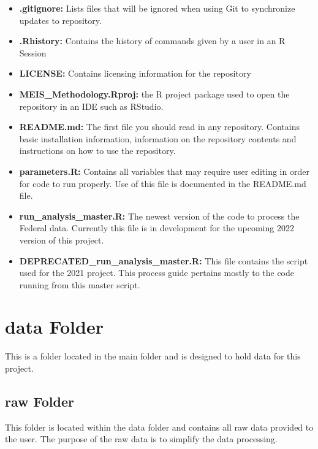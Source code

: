 \documentclass[
]{book}
\providecommand{\tightlist}{%
  \setlength{\itemsep}{0pt}\setlength{\parskip}{0pt}}
\begin{document}
\begin{itemize}
\tightlist
\item
  \textbf{.gitignore:} Lists files that will be ignored when using Git to synchronize updates to repository.
\item
  \textbf{.Rhistory:} Contains the history of commands given by a user in an R Session
\item
  \textbf{LICENSE:} Contains licensing information for the repository
\item
  \textbf{MEIS\_Methodology.Rproj:} the R project package used to open the repository in an IDE such as RStudio.
\item
  \textbf{README.md:} The first file you should read in any repository. Contains basic installation information, information on the repository contents and instructions on how to use the repository.
\item
  \textbf{parameters.R:} Contains all variables that may require user editing in order for code to run properly. Use of this file is documented in the README.md file.
\item
  \textbf{run\_analysis\_master.R:} The newest version of the code to process the Federal data. Currently this file is in development for the upcoming 2022 version of this project.
\item
  \textbf{DEPRECATED\_run\_analysis\_master.R:} This file contains the script used for the 2021 project. This process guide pertains mostly to the code running from this master script.
\end{itemize}

\hypertarget{data-folder}{%
\section{data Folder}\label{data-folder}}

This is a folder located in the main folder and is designed to hold data for this project.

\hypertarget{raw-folder}{%
\subsection{raw Folder}\label{raw-folder}}

This folder is located within the data folder and contains all raw data provided to the user. The purpose of the raw data is to simplify the data processing.
\end{document}
